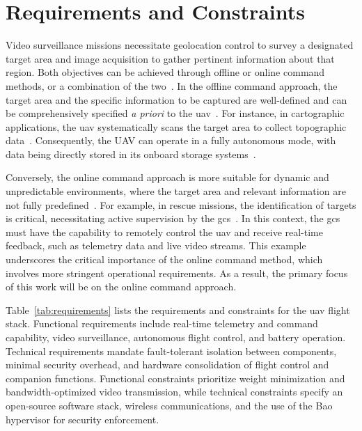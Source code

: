 \section{Requirements and Constraints}
\label{sec:req-sec}
Video surveillance missions necessitate geolocation control to survey a
designated target area and image acquisition to gather pertinent information
about that region. Both objectives can be achieved through offline or online
command methods, or a combination of the two~\cite{gugan2023path}.
%
In the offline command approach, the target area and the specific information to
be captured are well-defined and can be comprehensively specified \emph{a
priori} to the \gls{uav}~\cite{gugan2023path}. For instance, in cartographic
applications, the \gls{uav} systematically scans the target area to collect
topographic data~\cite{caroti_uav-borne_2017}. Consequently,
the UAV can operate in a fully autonomous mode, with data being directly stored
in its onboard storage systems~\cite{qgc-survey}.

Conversely, the online command approach is more suitable for dynamic and
unpredictable environments, where the target area and relevant information are
not fully predefined~\cite{gugan2023path}. For example, in rescue missions, the identification of
targets is critical, necessitating active supervision by the \gls{gcs}~\cite{mohsan2022towards}. In this
context, the \gls{gcs} must have the capability to remotely control the
\gls{uav} and receive real-time feedback, such as telemetry data and live video
streams.
%
This example underscores the critical importance of the online command method,
which involves more stringent operational requirements. As a result, the primary
focus of this work will be on the online command approach.

Table~\ref{tab:requirements} lists the requirements and constraints for the
\gls{uav} flight stack. Functional requirements include real-time telemetry and
command capability, video surveillance, autonomous flight control, and battery
operation. Technical requirements mandate fault-tolerant isolation between
components, minimal security overhead, and hardware consolidation of flight
control and companion functions. Functional constraints prioritize weight
minimization and bandwidth-optimized video transmission, while technical
constraints specify an open-source software stack, wireless communications,
and the use of the Bao hypervisor for security enforcement.

